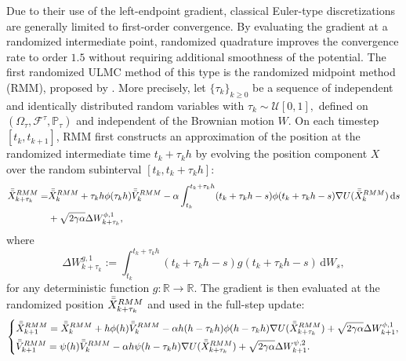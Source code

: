 \documentclass[12pt]{article}
\numberwithin{equation}{section}
\newcommand{\R}{\mathbb{R}}
\begin{document}
Due to their use of the left-endpoint
gradient, classical Euler-type discretizations are generally limited to
first-order convergence. By evaluating the gradient at a randomized intermediate
point, randomized quadrature improves the convergence rate to
order $1.5$ without requiring additional smoothness of the
potential.
%
The first randomized ULMC method of this type is the randomized
midpoint method (RMM), proposed by
\cite{shen2019randomized}.
More precisely, let $\{\tau_k\}_{k\geq0}$ be a sequence of
independent and identically distributed random variables with
\(
\tau_k\sim\mathcal U[0,1],
\)
defined on
$(\Omega_\tau,\mathcal F^\tau,\mathbb P_\tau)$ and independent
of the Brownian motion $W$. On each timestep
$[t_k,t_{k+1}]$, RMM first constructs an approximation of the
position at the randomized intermediate time
$t_k+\tau_kh$ by evolving the position component $X$ over the random
subinterval $[t_k,t_k+\tau_kh]$:
\begin{equation}
\label{intro-eq:random-position}
\begin{aligned}
\Bar{\Bar{X}}_{k+\tau_k}^{RMM}
= &
\Bar{\Bar{X}}_{k}^{RMM}
+
\tau_k h
\phi(\tau_k h)
\Bar{\Bar{V}}_{k}^{RMM}
- 
\alpha
\int^{t_{k}+\tau_k h}_{t_k} (t_{k}+\tau_k h-s)
\phi(t_{k}+\tau_k h-s)
\nabla U(\Bar{\Bar{X}}_k^{RMM})\, \mathrm{d}s 
\\   &
+
\sqrt{2\gamma\alpha} \Delta W_{k+\tau_k}^{\phi,1}
,
\end{aligned}
\end{equation}
where
\begin{equation}
\label{eq:define-Delta-W-t+tau}
\Delta W_{k+\tau_k}^{g,1}
:=
\int_{t_k}^{t_k+\tau_k h}
(t_k+\tau_k h-s)
g(t_k+\tau_k h-s)\,\mathrm dW_s,
\end{equation}
for any deterministic function $g: \R \to \R$.
The gradient is then evaluated at the randomized position $\Bar{\bar{X}}^{RMM}_{k+\tau_k}$ and used in the full-step update:
\begin{equation}
\label{eq:intro-RMM}
\left\{
\begin{aligned}
&
\Bar{\Bar{X}}_{k+1}^{RMM}
    =
    \Bar{\Bar{X}}_{k}^{RMM}
    +
    h\phi(h)\Bar{\Bar{V}}_{k}^{RMM}
    - 
   \alpha
  h
  (h-\tau_k h )
  \phi(h-\tau_k h)
    \nabla U(\Bar{\Bar{X}}_{k+\tau_k}^{RMM})
    +
    \sqrt{2\gamma\alpha}
    \Delta W_{k+1}^{\phi,1},  \\
    &
    \Bar{\Bar{V}}_{k+1}^{RMM}
    =
    \psi(h)
    \Bar{\Bar{V}}_{k}^{RMM}
    -
    \alpha h
    \psi(h-\tau_k h)
    \nabla U(\Bar{\Bar{X}}_{k+\tau_k}^{RMM}) 
    +
    \sqrt{2\gamma\alpha}
    \Delta W_{k+1}^{\psi,2}.
\end{aligned}
\right.
\end{equation}
\end{document}
